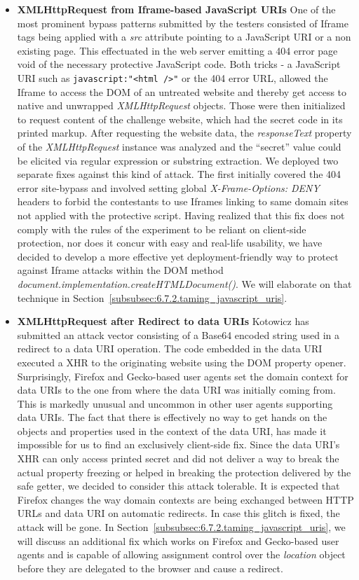       \begin{itemize}
	\item \textbf{XMLHttpRequest from Iframe-based JavaScript URIs} One of the most prominent bypass patterns submitted by the testers consisted of Iframe tags being applied with a \textit{src} attribute pointing to a JavaScript URI or a non existing page. This effectuated in the web server emitting a 404 error page void of the necessary protective JavaScript code. Both tricks - a JavaScript URI such as \texttt{javascript:"<html />"} or the 404 error URL, allowed the Iframe to access the DOM of an untreated website and thereby get access to native and unwrapped \textit{XMLHttpRequest} objects. Those were then initialized to request content of the challenge website, which had the secret code in its printed markup. After requesting the website data, the \textit{responseText} property of the \textit{XMLHttpRequest} instance was analyzed and the ``secret'' value could be elicited via regular expression or substring extraction. We deployed two separate fixes against this kind of attack. The first initially covered the 404 error site-bypass and involved setting global \textit{X-Frame-Options: DENY} headers to forbid the contestants to use Iframes linking to same domain sites not applied with the protective script. Having realized that this fix does not comply with the rules of the experiment to be reliant on client-side protection, nor does it concur with easy and real-life usability, we have decided to develop a more effective yet deployment-friendly way to protect against Iframe attacks within the DOM method \textit{document.implementation.createHTMLDocument()}. We will elaborate on that technique in Section~\ref{subsubsec:6.7.2.taming_javascript_uris}. 
	\item \textbf{XMLHttpRequest after Redirect to data URIs} Kotowicz has submitted an attack vector consisting of a Base64 encoded string used in a redirect to a data URI operation. The code embedded in the data URI executed a XHR to the originating website using the DOM property opener. Surprisingly, Firefox and Gecko-based user agents set the domain context for data URIs to the one from where the data URI was initially coming from. This is markedly unusual and uncommon in other user agents supporting data URIs. The fact that there is effectively no way to get hands on the objects and properties used in the context of the data URI, has made it impossible for us to find an exclusively client-side fix. Since the data URI's XHR can only access printed secret and did not deliver a way to break the actual property freezing or helped in breaking the protection delivered by the safe getter, we decided to consider this attack tolerable. It is  expected that Firefox changes the way domain contexts are being exchanged between HTTP URLs and data URI on automatic redirects. In case this glitch is fixed, the attack will be gone. In Section~\ref{subsubsec:6.7.2.taming_javascript_uris}, we will discuss an additional fix which works on Firefox and Gecko-based user agents and is capable of allowing assignment control over the \textit{location} object before they are delegated to the browser and cause a redirect.
      \end{itemize}

